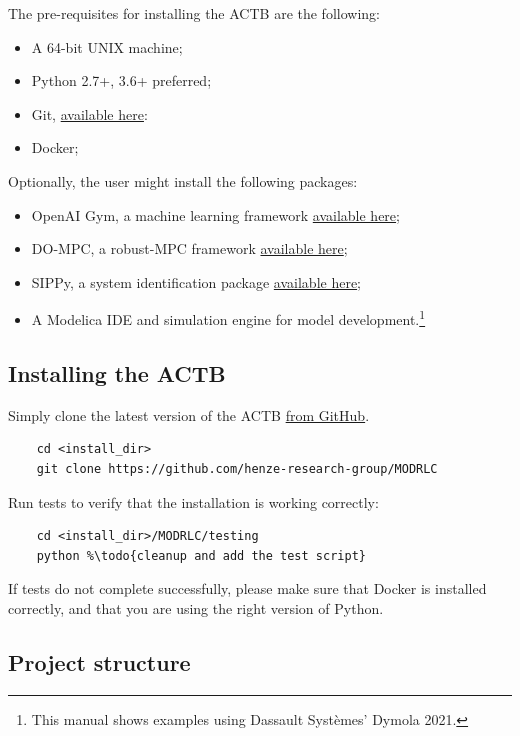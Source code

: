 \documentclass{article}
\begin{document}
The pre-requisites for installing the ACTB are the following:
\begin{itemize}
    \item A 64-bit UNIX machine;
    \item Python 2.7+, 3.6+ preferred;
    \item Git, \href{https://git-scm.com/}{available here}:
    \item Docker;
\end{itemize}
Optionally, the user might install the following packages:
\begin{itemize}
    \item OpenAI Gym, a machine learning framework \href{https://gym.openai.com/}{available here};
    \item DO-MPC, a robust-MPC framework \href{https://www.do-mpc.com/en/latest/}{available here};
    \item SIPPy, a system identification package \href{https://github.com/CPCLAB-UNIPI/SIPPY}{available here};
    \item A Modelica IDE and simulation engine for model development.\footnote{This manual shows examples using Dassault Systèmes' Dymola 2021.} 
\end{itemize}

\subsection{Installing the ACTB}\label{s:install-actb}

Simply clone the latest version of the ACTB \href{https://github.com/henze-research-group/MODRLC}{from GitHub}.
\begin{verbatim}
    cd <install_dir>
    git clone https://github.com/henze-research-group/MODRLC
\end{verbatim}

Run tests to verify that the installation is working correctly:
\begin{verbatim}
    cd <install_dir>/MODRLC/testing
    python %\todo{cleanup and add the test script}
\end{verbatim}

If tests do not complete successfully, please make sure that Docker is installed correctly, and that you are using the right version of Python. 

\subsection{Project structure}\label{s:projectstructure}
\end{document}
